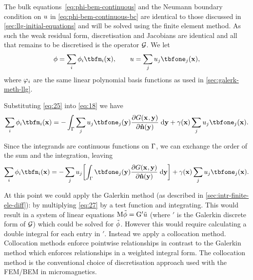 The bulk equations~\cref{eq:phi-bem-continuous} and the Neumann boundary condition on $u$ in \cref{eq:phi-bem-continuous-bc} are identical to those discussed in \cref{sec:llg-initial-equations} and will be solved using the finite element method.
As such the weak residual form, discretisation and Jacobians are identical and all that remains to be discretised is the operator $\mathcal{G}$.
We let
\begin{equation}
  \phim = \sum_\ibasis \phim_{\ibasis} \tbfm_{\ibasis}(\xv),
  \qquad
  \phione = \sum_\ibasisb \phione_{\ibasisb} \tbfone_{\ibasisb}(\xv),
  \label{eq:25}
\end{equation}
where $\varphi_i$ are the same linear polynomial basis functions as used in \cref{sec:galerk-meth-llg}.

Substituting \cref{eq:25} into \cref{eq:18} we have
\begin{equation}
  \sum_\ibasis \phim_{\ibasis} \tbfm_{\ibasis}(\xv) =
  - \int_{\boundd} \sum_\ibasisb \phione_{\ibasisb} \tbfone_{\ibasisb}(\yv)
  \pd{\Green}{\nv(\yv)} \d \yv
   + \gamma(\xv) \sum_\ibasisb \phione_{\ibasisb} \tbfone_{\ibasisb}(\xv).
\end{equation}

Since the integrands are continuous functions on ${\Gamma}$, we can exchange the order of the sum and the integration, leaving
\begin{equation}
  \sum_\ibasis \phim_{\ibasis} \tbfm_{\ibasis}(\xv) =
  - \sum_\ibasisb  \phione_{\ibasisb}  \bigs{\int_{\boundd} \tbfone_{\ibasisb}(\yv)
    \pd{\Green}{\nv(\yv)} \d \yv }
  + \gamma(\xv) \sum_\ibasisb \phione_{\ibasisb} \tbfone_{\ibasisb}(\xv).
  \label{eq:27}
\end{equation}

At this point we could apply the Galerkin method (as described in \cref{sec:intr-finite-ele-diff}): by multiplying \cref{eq:27} by a test function and integrating.
This would result in a system of linear equations $\mathrm{M} \tilde{\phi} = {\mathbf{\mathrm{G}}}' \tilde{u}$ (where $\bm'$ is the Galerkin discrete form of $\mathcal{G}$) which could be solved for $\tilde{\phi}$.
However this would require calculating a double integral for each entry in $\bm'$.
Instead we apply a collocation method.
Collocation methods enforce pointwise relationships in contrast to the Galerkin method which enforces relationships in a weighted integral form.
The collocation method is the conventional choice of discretisation approach used with the FEM/BEM in micromagnetics.


